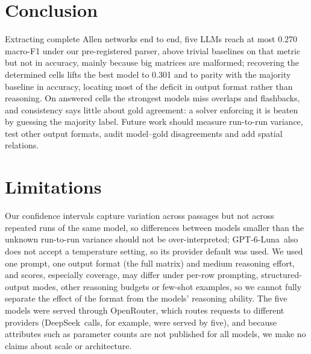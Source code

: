 \documentclass[11pt]{article}
\newcommand{\Ds}{DeepSeek}
\newcommand{\Gp}{GPT-6-Luna}
\begin{document}
\section{Conclusion}
\label{sec:conclusion}

Extracting complete Allen networks end to end, five LLMs reach at most 0.270 macro-F1 under our pre-registered parser, above trivial baselines on that metric but not in accuracy, mainly because big matrices are malformed; recovering the determined cells lifts the best model to 0.301 and to parity with the majority baseline in accuracy, locating most of the deficit in output format rather than reasoning. On answered cells the strongest models miss overlaps and flashbacks, and consistency says little about gold agreement: a solver enforcing it is beaten by guessing the majority label. Future work should measure run-to-run variance, test other output formats, audit model--gold disagreements and add spatial relations.

\section*{Limitations}
\label{sec:limitations}

Our confidence intervals capture variation across passages but not across repeated runs of the same model, so differences between models smaller than the unknown run-to-run variance should not be over-interpreted; \Gp\ also does not accept a temperature setting, so its provider default was used. We used one prompt, one output format (the full matrix) and medium reasoning effort, and scores, especially coverage, may differ under per-row prompting, structured-output modes, other reasoning budgets or few-shot examples, so we cannot fully separate the effect of the format from the models' reasoning ability. The five models were served through OpenRouter, which routes requests to different providers (\Ds\ calls, for example, were served by five), and because attributes such as parameter counts are not published for all models, we make no claims about scale or architecture.
\end{document}
